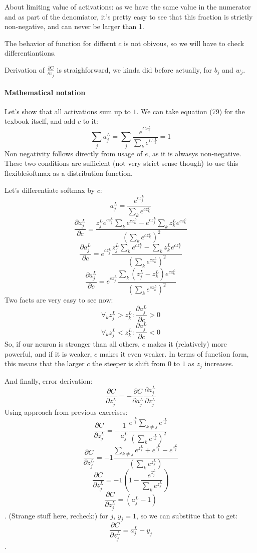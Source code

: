 \documentclass{article}
\begin{document}
About limiting value of activations: as we have the same value in the numerator and as part of the denomiator,
it's pretty easy to see that this fraction is strictly non-negative, and can never be larger than 1.

The behavior of function for differnt $c$ is not obivous, so we will have to check differentiantions.

Derivation of $\frac{\partial C}{\partial z_j}$ is straighforward, we kinda did before actually, for $b_j$ and $w_j$.

\paragraph{Mathematical notation}
Let's show that all activations sum up to $1$. We can take equation (79) for the texbook itself, and add $c$ to it:
$$\sum_j a^L_j  = \sum_j \frac{ e^{C z^L_j}}{\sum_k e^{C z^L_k}} = 1$$
Non negativity follows directly from usage of $e$, as it is alwasys non-negative.
These two conditions are sufficient (not very strict sense though) to use this \'flexible\' softmax as a distribution function.

Let's differentiate softmax by $c$:
$$a^L_j = \frac{e^{cz^L_j}}{\sum_{k} e^{cz^L_k}}$$
$$\frac {\partial a^L_j}{\partial c} = \frac {z^L_j e^{cz^L_j} \sum_k e^{cz^L_k} - e^{cz^L_j} \sum_k z^L_k e^{cz^L_k}}{(\sum_{k} e^{cz^L_k})^2}$$
$$\frac {\partial a^L_j}{\partial c} = e^{cz^L_j} \frac {z^L_j \sum_k e^{cz^L_k} - \sum_k z^L_k e^{cz^L_k}}{(\sum_{k} e^{cz^L_k})^2}$$
$$\frac {\partial a^L_j}{\partial c} = e^{cz^L_j} \frac {\sum_k (z^L_j - z^L_k) e^{cz^L_k}}{(\sum_{k} e^{cz^L_k})^2}$$
Two facts are very easy to see now:
$$\forall_k z_j^L > z_k^L: \frac {\partial a^L_j}{\partial c} > 0$$
$$\forall_k z_j^L < z_k^L: \frac {\partial a^L_j}{\partial c} < 0$$
So, if our neuron is stronger than all others, $c$ makes it (relatively) more powerful, and if it is weaker, $c$ makes it even weaker.
In terms of function form, this means that the larger $c$ the steeper is shift from $0$ to $1$ as $z_j$ increases.

And finally, error derivation:
$$\frac{\partial C}{\partial z^L_{j}} = - \frac{\partial C}{\partial a^L_{j}} \frac{\partial a^L_{j}}{\partial z^L_j}$$
Using approach from previous exercises:
$$\frac{\partial C}{\partial z^L_{j}} = - \frac{1}{a^L_j}  \frac{e^{z^L_j} \sum_{k \neq j} e^{z^L_k}}{(\sum_{k} e^{z^L_k})^2}$$
$$\frac{\partial C}{\partial z^L_{j}} = - 1 \frac{\sum_{k \neq j} e^{z^L_k} + e^{z^L_j} - e^{z^L_j}}{ (\sum_{k} e^{z^L_k}) }$$
$$\frac{\partial C}{\partial z^L_{j}} = - 1(1 - \frac{e^{z^L_j}}{ \sum_{k} e^{z^L_k}})$$
$$\frac{\partial C}{\partial z^L_{j}} = (a^{L}_j - 1)$$.
(Strange stuff here, recheck:)
for $j$, $y_j = 1$, so we can substitue that to get:
$$\frac{\partial C}{\partial z^L_{j}} = a^{L}_j - y_j$$.
\end{document}

